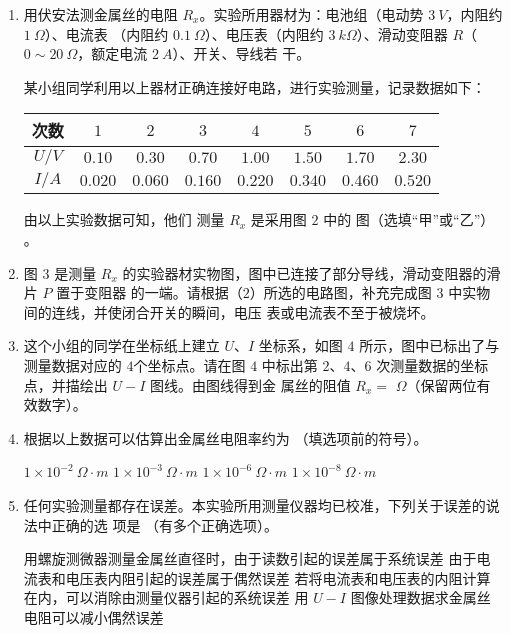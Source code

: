 \begin{enumerate}
\begin{enumerate}
\item 
用伏安法测金属丝的电阻 $ R_{x} $。实验所用器材为：电池组（电动势 $ 3 \ V $，内阻约 $ 1 \ \Omega $）、电流表
（内阻约 $ 0.1 \ \Omega $）、电压表（内阻约 $ 3 \ k\Omega $）、滑动变阻器 $ R $（$ 0 \sim 20 \ \Omega $，额定电流 $ 2 \ A $）、开关、导线若
干。

某小组同学利用以上器材正确连接好电路，进行实验测量，记录数据如下：
\begin{table}[h!]
\centering 
\begin{tabular}{|c|c|c|c|c|c|c|c|}
\hline 
次数 & $ 1 $ & $ 2 $ & $ 3 $ & $ 4 $ & $ 5 $ & $ 6 $ & $ 7 $
 \\
\hline
$ U/V $ & $ 0.10 $ & $ 0.30 $ & $ 0.70 $ & $ 1.00 $ & $ 1.50 $ & $ 1.70 $ & $ 2.30 $
 \\
\hline
$ I/A $ & $ 0.020 $ & $ 0.060 $ & $ 0.160 $ & $ 0.220 $ & $ 0.340 $ & $ 0.460 $ & $ 0.520 $\\ 
\hline 
\end{tabular}
\end{table} 


由以上实验数据可知，他们
测量 $ R_{x} $ 是采用图 $ 2 $ 中的 \underlinegap 
图（选填“甲”或“乙”）
。

\item 
图 $ 3 $ 是测量 $ R_{x} $ 的实验器材实物图，图中已连接了部分导线，滑动变阻器的滑片 $ P $ 置于变阻器
的一端。请根据（$ 2 $）所选的电路图，补充完成图 $ 3 $ 中实物间的连线，并使闭合开关的瞬间，电压
表或电流表不至于被烧坏。


\item 
这个小组的同学在坐标纸上建立 $ U $、$ I $ 坐标系，如图 $ 4 $ 所示，图中已标出了与测量数据对应的
$ 4 $个坐标点。请在图 $ 4 $ 中标出第 $ 2 $、$ 4 $、$ 6 $ 次测量数据的坐标点，并描绘出 $ U-I $ 图线。由图线得到金
属丝的阻值 $ R_{x} = $ \underlinegap 
$ \Omega $（保留两位有效数字）。

\item 
根据以上数据可以估算出金属丝电阻率约为
\underlinegap 
（填选项前的符号）。

\fourchoices
{$ 1 \times 10^{-2} \ \Omega \cdot m $}
{$ 1 \times 10^{-3} \ \Omega \cdot m $}
{$ 1 \times 10^{-6} \ \Omega \cdot m $}
{$ 1 \times 10^{-8} \ \Omega \cdot m $}

\item 
任何实验测量都存在误差。本实验所用测量仪器均已校准，下列关于误差的说法中正确的选
项是
\underlinegap 
（有多个正确选项）。

\fourchoices
{用螺旋测微器测量金属丝直径时，由于读数引起的误差属于系统误差}
{由于电流表和电压表内阻引起的误差属于偶然误差}
{若将电流表和电压表的内阻计算在内，可以消除由测量仪器引起的系统误差}
{用 $ U-I $ 图像处理数据求金属丝电阻可以减小偶然误差}




\end{enumerate}
\end{enumerate}
